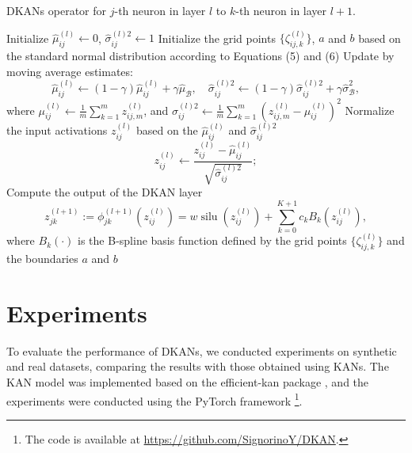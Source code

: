 \documentclass[11pt]{scrartcl}
\begin{document}
\begin{algorithm}[htbp]
	\caption{DKANs operator for $j$-th neuron in layer $l$ to $k$-th neuron in layer $l+1$.}
	\label{alg:dkan-operator}
	Initialize $\widehat{\mu}_{ij}^{(l)} \leftarrow 0$, $\widehat{\sigma}_{ij}^{(l)2} \leftarrow 1$\;
	Initialize the grid points $\{\zeta_{ij,k}^{(l)}\}$, $a$ and $b$ based on the standard normal distribution according to Equations (5) and (6)\;
	 {
	Update by moving average estimates:
	\begin{equation*}
		\widehat{\mu}_{ij}^{(l)} \leftarrow (1 - \gamma)\widehat{\mu}_{ij}^{(l)} + \gamma\widehat{\mu}_{\mathcal{B}}, \quad \widehat{\sigma}_{ij}^{(l)2} \leftarrow (1 - \gamma)\widehat{\sigma}_{ij}^{(l)2} + \gamma\widehat{\sigma}_{\mathcal{B}}^{2},
	\end{equation*}
	where $\mu_{ij}^{(l)} \leftarrow \frac{1}{m}\sum_{k=1}^{m}z_{ij,m}^{(l)}$, and $\sigma_{ij}^{(l)2} \leftarrow \frac{1}{m}\sum_{k=1}^{m}\left(z_{ij,m}^{(l)} - \mu_{ij}^{(l)}\right)^{2}$\;
	Normalize the input activations $z_{ij}^{(l)}$ based on the $\widehat{\mu}_{ij}^{(l)}$ and $\widehat{\sigma}_{ij}^{(l)2}$
	\begin{equation*}
		z_{ij}^{(l)} \leftarrow \frac{z_{ij}^{(l)} - \widehat{\mu}_{ij}^{(l)}}{\sqrt{\widehat{\sigma}_{ij}^{(l)2}}};
	\end{equation*}
	Compute the output of the DKAN layer
	\begin{equation*}
		z_{jk}^{(l+1)}:=\phi_{jk}^{(l+1)}(z_{ij}^{(l)})=w\operatorname{silu}(z_{ij}^{(l)})+\sum_{k=0}^{K+1}c_{k}B_{k}(z_{ij}^{(l)}),
	\end{equation*}
	where $B_{k}(\cdot)$ is the B-spline basis function defined by the grid points $\{\zeta_{ij,k}^{(l)}\}$ and the boundaries $a$ and $b$\;
	}
\end{algorithm}

\section{Experiments}

To evaluate the performance of DKANs, we conducted experiments on synthetic and real datasets, comparing the results with those obtained using KANs.
The KAN model was implemented based on the efficient-kan package \cite{blealtan2024blealtan}, and the experiments were conducted using the PyTorch framework \footnote{The code is available at \href{https://github.com/SignorinoY/DKAN}{https://github.com/SignorinoY/DKAN}.}.
\end{document}
